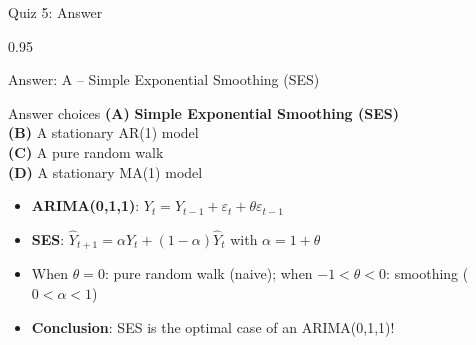 \documentclass[9pt, aspectratio=169, t]{beamer}
\begin{document}
\begin{frame}{Quiz 5: Answer}
    \begin{cminipage}{0.95\textwidth}
    {\small
    \begin{exampleblock}{Answer: A -- Simple Exponential Smoothing (SES)}

        \vspace{0.1cm}

    \begin{block}{Answer choices}
        \textcolor{MainBlue}{\textbf{(A)}} \textbf{\textcolor{Forest}{Simple Exponential Smoothing (SES)}} \correct\\[3pt]
        \textcolor{MainBlue}{\textbf{(B)}} A stationary AR(1) model \incorrect\\[3pt]
        \textcolor{MainBlue}{\textbf{(C)}} A pure random walk \incorrect\\[3pt]
        \textcolor{MainBlue}{\textbf{(D)}} A stationary MA(1) model \incorrect
    \end{block}

        \vspace{0.2cm}

        \begin{itemize}
            \item \textbf{ARIMA(0,1,1)}: $Y_t = Y_{t-1} + \varepsilon_t + \theta\varepsilon_{t-1}$
            \item \textbf{SES}: $\hat{Y}_{t+1} = \alpha Y_t + (1-\alpha)\hat{Y}_t$ with $\alpha = 1 + \theta$
            \item When $\theta = 0$: pure random walk (naive); when $-1 < \theta < 0$: smoothing ($0 < \alpha < 1$)
            \item \textbf{Conclusion}: SES is the optimal case of an ARIMA(0,1,1)!
        \end{itemize}
    \end{exampleblock}
    }

    \end{cminipage}
\end{frame}
\end{document}

